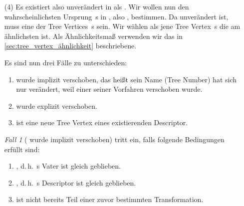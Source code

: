 \begin{itemize}
  
 

\item[(4)] %
Es existiert  also unverändert in  als . Wir wollen nun den wahrscheinlichsten Ursprung \,s in , also , bestimmen. Da  unverändert ist, muss  eine der Tree Vertices \,s sein. Wir wählen als  jene Tree Vertex \,s die  am ähnlichsten ist. Als Ähnlichkeitsmaß verwenden wir das in \ref{sec:tree_vertex_ähnlichkeit} \textit{} beschriebene. \par

Es sind nun drei Fälle zu unterschieden: 
\begin{enumerate}
  \item {} wurde implizit verschoben, das heißt sein Name (Tree Number) hat sich nur verändert, weil einer seiner Vorfahren verschoben wurde.
  \item {} wurde explizit verschoben.
  \item {} ist eine neue Tree Vertex eines existierenden Descriptor.
\end{enumerate} 

\textit{Fall 1} ( wurde implizit verschoben) tritt ein, falls folgende Bedingungen erfüllt sind:
\begin{enumerate}
  \item {}, d.\,h. \,s Vater ist gleich geblieben. 
  \item {}, d.\,h. \,s Descriptor ist gleich geblieben. 
  \item {} ist nicht bereits Teil einer zuvor bestimmten Transformation.
\end{enumerate}


\end{itemize}
